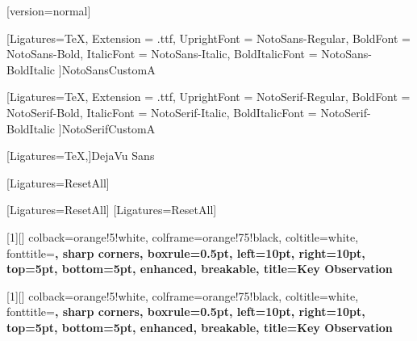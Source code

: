 \usepackage{mathtools}
\usepackage[warnings-off={mathtools-colon,mathtools-overbracket}]{unicode-math}
[version=normal]

\newfontfamily{\NotoSansFont}[Ligatures=TeX,
Extension = .ttf,
    UprightFont = NotoSans-Regular,
    BoldFont = NotoSans-Bold,
    ItalicFont = NotoSans-Italic,
    BoldItalicFont = NotoSans-BoldItalic
    ]{NotoSansCustomA}
    
\newfontfamily{\NotoSerifFont}[Ligatures=TeX,
Extension = .ttf,
    UprightFont = NotoSerif-Regular,
    BoldFont = NotoSerif-Bold,
    ItalicFont = NotoSerif-Italic,
    BoldItalicFont = NotoSerif-BoldItalic
    ]{NotoSerifCustomA}

\newfontfamily{\DejaVuSansFont}[Ligatures=TeX,]{DejaVu Sans}

[Ligatures=ResetAll]

[Ligatures=ResetAll]
[Ligatures=ResetAll]

\usepackage{newunicodechar}


\newfontfamily{}
\newsavebox{\lstbreakbox}

[1][]{
  colback=orange!5!white,    %
  colframe=orange!75!black,  %
  coltitle=white,            %
  fonttitle=\bfseries,
  sharp corners,
  boxrule=0.5pt,
  left=10pt,
  right=10pt,
  top=5pt,
  bottom=5pt,
  enhanced,
  breakable,                 %
  title={Key Observation}
}

[1][]{
  colback=orange!5!white,    %
  colframe=orange!75!black,  %
  coltitle=white,            %
  fonttitle=\bfseries,
  sharp corners,
  boxrule=0.5pt,
  left=10pt,
  right=10pt,
  top=5pt,
  bottom=5pt,
  enhanced,
  breakable,                 %
  title={Key Observation}
}

